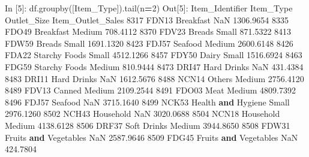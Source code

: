 \documentclass[
]{book}
\newenvironment{Shaded}{\begin{snugshade}}{\end{snugshade}}
\newcommand{\DecValTok}[1]{\textcolor[rgb]{0.00,0.00,0.81}{#1}}
\newcommand{\FloatTok}[1]{\textcolor[rgb]{0.00,0.00,0.81}{#1}}
\newcommand{\KeywordTok}[1]{\textcolor[rgb]{0.13,0.29,0.53}{\textbf{#1}}}
\newcommand{\NormalTok}[1]{#1}
\newcommand{\OperatorTok}[1]{\textcolor[rgb]{0.81,0.36,0.00}{\textbf{#1}}}
\newcommand{\StringTok}[1]{\textcolor[rgb]{0.31,0.60,0.02}{#1}}
\begin{document}
\begin{Shaded}
\begin{Highlighting}[]
\NormalTok{In [}\DecValTok{5}\NormalTok{]: df.groupby([}\StringTok{\textquotesingle{}Item\_Type\textquotesingle{}}\NormalTok{]).tail(n}\OperatorTok{=}\DecValTok{2}\NormalTok{)}
\NormalTok{Out[}\DecValTok{5}\NormalTok{]:}
\NormalTok{     Item\_Identifier              Item\_Type Outlet\_Size  Item\_Outlet\_Sales}
\DecValTok{8317}\NormalTok{           FDN13              Breakfast         NaN          }\FloatTok{1306.9654}
\DecValTok{8335}\NormalTok{           FDO49              Breakfast      Medium           }\FloatTok{708.4112}
\DecValTok{8370}\NormalTok{           FDV23                 Breads       Small           }\FloatTok{871.5322}
\DecValTok{8413}\NormalTok{           FDW59                 Breads       Small          }\FloatTok{1691.1320}
\DecValTok{8423}\NormalTok{           FDJ57                Seafood      Medium          }\FloatTok{2600.6148}
\DecValTok{8426}\NormalTok{           FDA22          Starchy Foods       Small          }\FloatTok{4512.1266}
\DecValTok{8457}\NormalTok{           FDY50                  Dairy       Small          }\FloatTok{1516.6924}
\DecValTok{8463}\NormalTok{           FDG59          Starchy Foods      Medium           }\FloatTok{810.9444}
\DecValTok{8473}\NormalTok{           DRI47            Hard Drinks         NaN           }\FloatTok{431.4384}
\DecValTok{8483}\NormalTok{           DRI11            Hard Drinks         NaN          }\FloatTok{1612.5676}
\DecValTok{8488}\NormalTok{           NCN14                 Others      Medium          }\FloatTok{2756.4120}
\DecValTok{8489}\NormalTok{           FDV13                 Canned      Medium          }\FloatTok{2109.2544}
\DecValTok{8491}\NormalTok{           FDO03                   Meat      Medium          }\FloatTok{4809.7392}
\DecValTok{8496}\NormalTok{           FDJ57                Seafood         NaN          }\FloatTok{3715.1640}
\DecValTok{8499}\NormalTok{           NCK53     Health }\KeywordTok{and}\NormalTok{ Hygiene       Small          }\FloatTok{2976.1260}
\DecValTok{8502}\NormalTok{           NCH43              Household         NaN          }\FloatTok{3020.0688}
\DecValTok{8504}\NormalTok{           NCN18              Household      Medium          }\FloatTok{4138.6128}
\DecValTok{8506}\NormalTok{           DRF37            Soft Drinks      Medium          }\FloatTok{3944.8650}
\DecValTok{8508}\NormalTok{           FDW31  Fruits }\KeywordTok{and}\NormalTok{ Vegetables         NaN          }\FloatTok{2587.9646}
\DecValTok{8509}\NormalTok{           FDG45  Fruits }\KeywordTok{and}\NormalTok{ Vegetables         NaN           }\FloatTok{424.7804}

\end{Highlighting}
\end{Shaded}
\end{document}

